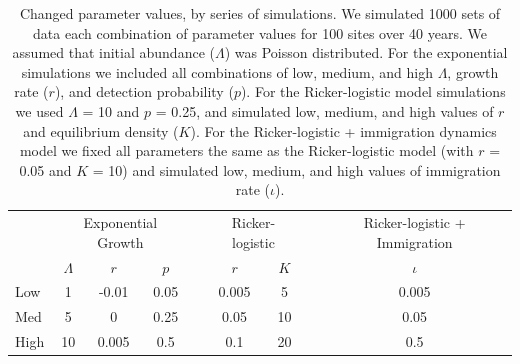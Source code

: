 \documentclass[12pt]{article}
\begin{document}
\begin{table}[t]
  \centering
\caption{Changed parameter values, by series of simulations.  We
simulated 1000 sets of data each combination of parameter values
for 100 sites over 40 years.  We assumed that initial abundance
($\Lambda$) was Poisson distributed.  For the exponential 
simulations we included all combinations of low, medium, and
high $\Lambda$, growth rate ($r$), and detection probability ($p$).
For the Ricker-logistic model simulations we used $\Lambda$ = 10 and $p$ = 0.25, and
simulated low, medium, and high values of $r$ and equilibrium density ($K$).
For the Ricker-logistic + immigration dynamics model we fixed all parameters the
same as the Ricker-logistic model (with $r$ = 0.05 and $K$ = 10) and
simulated low, medium, and high values of immigration rate ($\iota$).}  
\begin{tabular}{lcccccccc}
    \hline
    & \multicolumn{3}{c}{Exponential Growth} && \multicolumn{2}{c}{Ricker-logistic} &&
    Ricker-logistic + Immigration \\
    \cline{2-4}     \cline{6-7}    \cline{9-9}
& $\Lambda$ & $r$ & $p$ && $r$  & $K$ && $\iota$  \\    
\hline
    Low	        &1	&-0.01	&0.05	&&0.005	 &5	&&0.005  \\
    Med	        &5	&0	&0.25	&&0.05	&10	&&0.05   \\
    High		 &10 &0.005	&0.5	&&0.1	&20	&&0.5    \\
    \hline
  \end{tabular}
\end{table}

\newpage
\end{document}
